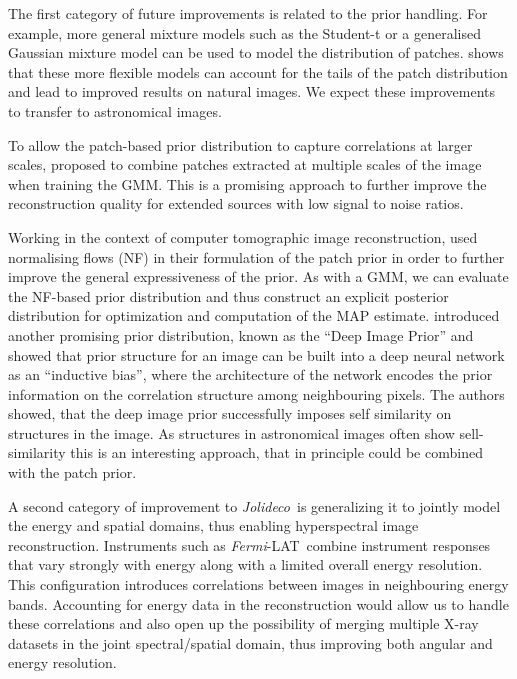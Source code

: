 \documentclass[twocolumn, lineno]{aastex631}
\newcommand{\fermi}{\textit{Fermi}-LAT~}
\newcommand{\jolideco}{\textit{Jolideco}~}
\newcommand{\xray}{X-ray\xspace}
\begin{document}
    The first category of future improvements is related to the prior handling. For example, more general mixture models such as the Student-t or a generalised Gaussian mixture model can be used to model the distribution of patches. \citet{VanDenOord2014} shows that these more flexible models can account for the tails of the patch distribution and lead to improved results on natural images. We expect these improvements to transfer to astronomical images.

    
    To allow the patch-based prior distribution to capture correlations at larger scales,
    \cite{Papyan2015} proposed to combine patches extracted at multiple scales of the image when training the GMM. This is a promising approach to further improve the reconstruction quality for extended sources with low signal to noise ratios.
    
    Working in the context of computer tomographic image reconstruction, \cite{Altekrueger2022} used normalising flows (NF) in their formulation of the patch prior in order to further improve the general expressiveness of the prior. As with a GMM, we can evaluate the NF-based prior distribution and thus construct an explicit posterior distribution for optimization and computation of the MAP estimate. \citet{Ulyanov2017} introduced another promising prior distribution, known as the \enquote{Deep Image Prior} and showed that prior structure for an image can be built into a deep neural network as an \enquote{inductive bias}, where the architecture of the network encodes the prior information on the correlation structure among neighbouring pixels. The authors showed, that the deep image prior successfully imposes self similarity on structures in the image. As structures in astronomical images often show sell-similarity this is an interesting approach, that in principle could be combined with the patch prior.

    A second category of improvement to \jolideco is generalizing it to jointly model the energy and spatial domains, thus enabling hyperspectral image reconstruction. Instruments such as \fermi combine instrument responses that vary strongly with energy along with a limited overall energy resolution. This configuration introduces correlations between images in neighbouring energy bands. Accounting for energy data in the reconstruction would allow us to handle these correlations and also open up the possibility of merging multiple \xray datasets in the joint spectral/spatial domain,  thus improving both  angular and energy resolution. 
\end{document}
